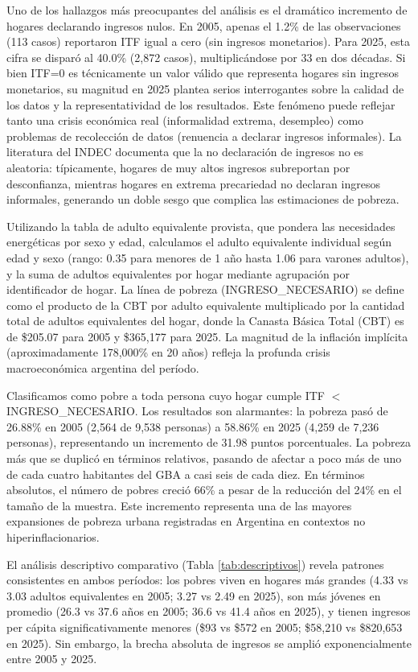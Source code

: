 \documentclass[11pt,a4paper]{article}
\begin{document}
Uno de los hallazgos más preocupantes del análisis es el dramático incremento de hogares declarando ingresos nulos. En 2005, apenas el 1.2\% de las observaciones (113 casos) reportaron ITF igual a cero (sin ingresos monetarios). Para 2025, esta cifra se disparó al 40.0\% (2,872 casos), multiplicándose por 33 en dos décadas. Si bien ITF=0 es técnicamente un valor válido que representa hogares sin ingresos monetarios, su magnitud en 2025 plantea serios interrogantes sobre la calidad de los datos y la representatividad de los resultados. Este fenómeno puede reflejar tanto una crisis económica real (informalidad extrema, desempleo) como problemas de recolección de datos (renuencia a declarar ingresos informales). La literatura del INDEC documenta que la no declaración de ingresos no es aleatoria: típicamente, hogares de muy altos ingresos subreportan por desconfianza, mientras hogares en extrema precariedad no declaran ingresos informales, generando un doble sesgo que complica las estimaciones de pobreza.

Utilizando la tabla de adulto equivalente provista, que pondera las necesidades energéticas por sexo y edad, calculamos el adulto equivalente individual según edad y sexo (rango: 0.35 para menores de 1 año hasta 1.06 para varones adultos), y la suma de adultos equivalentes por hogar mediante agrupación por identificador de hogar. La línea de pobreza (INGRESO\_NECESARIO) se define como el producto de la CBT por adulto equivalente multiplicado por la cantidad total de adultos equivalentes del hogar, donde la Canasta Básica Total (CBT) es de \$205.07 para 2005 y \$365,177 para 2025. La magnitud de la inflación implícita (aproximadamente 178,000\% en 20 años) refleja la profunda crisis macroeconómica argentina del período.

Clasificamos como pobre a toda persona cuyo hogar cumple ITF $<$ INGRESO\_NECESARIO. Los resultados son alarmantes: la pobreza pasó de 26.88\% en 2005 (2,564 de 9,538 personas) a 58.86\% en 2025 (4,259 de 7,236 personas), representando un incremento de 31.98 puntos porcentuales. La pobreza más que se duplicó en términos relativos, pasando de afectar a poco más de uno de cada cuatro habitantes del GBA a casi seis de cada diez. En términos absolutos, el número de pobres creció 66\% a pesar de la reducción del 24\% en el tamaño de la muestra. Este incremento representa una de las mayores expansiones de pobreza urbana registradas en Argentina en contextos no hiperinflacionarios.

El análisis descriptivo comparativo (Tabla \ref{tab:descriptivos}) revela patrones consistentes en ambos períodos: los pobres viven en hogares más grandes (4.33 vs 3.03 adultos equivalentes en 2005; 3.27 vs 2.49 en 2025), son más jóvenes en promedio (26.3 vs 37.6 años en 2005; 36.6 vs 41.4 años en 2025), y tienen ingresos per cápita significativamente menores (\$93 vs \$572 en 2005; \$58,210 vs \$820,653 en 2025). Sin embargo, la brecha absoluta de ingresos se amplió exponencialmente entre 2005 y 2025.
\end{document}
